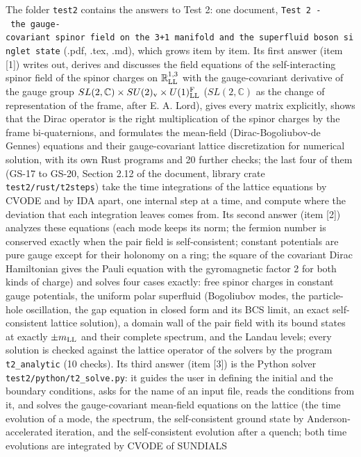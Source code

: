 \documentclass[
  10pt,
]{article}
\begin{document}
The folder \texttt{test2} contains the answers to Test 2: one document,
\texttt{Test\ 2\ -\ the\ gauge-covariant\ spinor\ field\ on\ the\ 3+1\ manifold\ and\ the\ superfluid\ boson\ singlet\ state}
(.pdf, .tex, .md), which grows item by item. Its first answer (item
{[}1{]}) writes out, derives and discusses the field equations of the
self-interacting spinor field of the spinor charges on
\(\mathbb R^{1,3}_{\rm LL}\) with the gauge-covariant derivative of the
gauge group
\(SL(2,\mathbb C)\times SU(2)_{\rm v}\times U(1)^{\rm F}_{\rm LL}\)
(\(SL(2,\mathbb C)\) as the change of representation of the frame, after
E. A. Lord), gives every matrix explicitly, shows that the Dirac
operator is the right multiplication of the spinor charges by the frame
bi-quaternions, and formulates the mean-field (Dirac-Bogoliubov-de
Gennes) equations and their gauge-covariant lattice discretization for
numerical solution, with its own Rust programs and 20 further checks;
the last four of them (GS-17 to GS-20, Section 2.12 of the document,
library crate \texttt{test2/rust/t2steps}) take the time integrations of
the lattice equations by CVODE and by IDA apart, one internal step at a
time, and compute where the deviation that each integration leaves comes
from. Its second answer (item {[}2{]}) analyzes these equations (each
mode keeps its norm; the fermion number is conserved exactly when the
pair field is self-consistent; constant potentials are pure gauge except
for their holonomy on a ring; the square of the covariant Dirac
Hamiltonian gives the Pauli equation with the gyromagnetic factor 2 for
both kinds of charge) and solves four cases exactly: free spinor charges
in constant gauge potentials, the uniform polar superfluid (Bogoliubov
modes, the particle-hole oscillation, the gap equation in closed form
and its BCS limit, an exact self-consistent lattice solution), a domain
wall of the pair field with its bound states at exactly
\(\pm m_{\rm LL}\) and their complete spectrum, and the Landau levels;
every solution is checked against the lattice operator of the solvers by
the program \texttt{t2\_analytic} (10 checks). Its third answer (item
{[}3{]}) is the Python solver \texttt{test2/python/t2\_solve.py}: it
guides the user in defining the initial and the boundary conditions,
asks for the name of an input file, reads the conditions from it, and
solves the gauge-covariant mean-field equations on the lattice (the time
evolution of a mode, the spectrum, the self-consistent ground state by
Anderson-accelerated iteration, and the self-consistent evolution after
a quench; both time evolutions are integrated by CVODE of SUNDIALS
\end{document}
